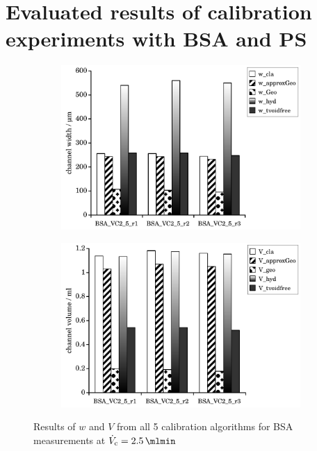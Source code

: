 \section*{Evaluated results of calibration experiments with BSA and PS}
\begin{figure}[h]
  \begin{center}
    \begin{subfigure}{0.49\linewidth}
      \includegraphics[width=\linewidth]{./images/data/img_calibW_BSA_VC_2_5.pdf}
      \label{subfig:calibRes_BSA_VC2_5_w}
    \end{subfigure}
    \begin{subfigure}{0.49\linewidth}
      \includegraphics[width=\linewidth]{./images/data/img_calibV_BSA_VC_2_5.pdf}
    \end{subfigure}
  \end{center}
  \vspace*{-3ex}    
  \caption[Results of $w$ and $V$ from all 5 calibration algorithms for BSA measurements at
   $\Vc = \SI{2.5}{\mlmin}$]{
     Results of $w$ and $V$ from all 5 calibration algorithms for BSA measurements at
     $\Vc = \SI{2.5}{\mlmin}$
}
\label{fig:calibRes_BSA_VC2_5}
\end{figure}
